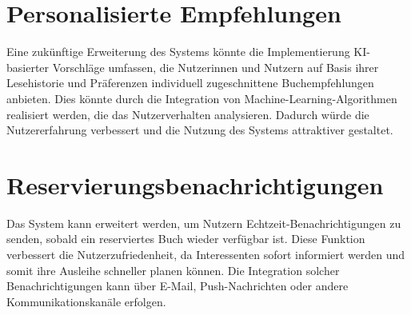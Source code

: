 \section{Personalisierte Empfehlungen}

Eine zukünftige Erweiterung des Systems könnte die Implementierung KI-basierter Vorschläge umfassen, die Nutzerinnen und Nutzern auf Basis ihrer Lesehistorie und Präferenzen individuell zugeschnittene Buchempfehlungen anbieten. Dies könnte durch die Integration von Machine-Learning-Algorithmen realisiert werden, die das Nutzerverhalten analysieren. Dadurch würde die Nutzererfahrung verbessert und die Nutzung des Systems attraktiver gestaltet.


\section{Reservierungsbenachrichtigungen}
Das System kann erweitert werden, um Nutzern Echtzeit-Benachrichtigungen zu senden, sobald ein reserviertes Buch wieder verfügbar ist. Diese Funktion verbessert die Nutzerzufriedenheit, da Interessenten sofort informiert werden und somit ihre Ausleihe schneller planen können. Die Integration solcher Benachrichtigungen kann über E-Mail, Push-Nachrichten oder andere Kommunikationskanäle erfolgen.
